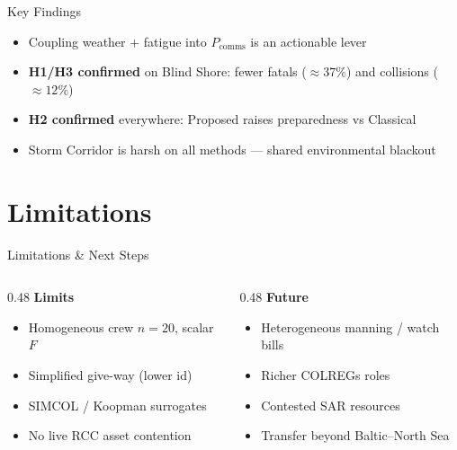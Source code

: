 \documentclass[aspectratio=169]{beamer}
\begin{document}
\begin{frame}{Key Findings}
    \begin{itemize}
        \item Coupling weather + fatigue into $P_{\text{comms}}$ is an actionable lever
        \item \textbf{H1/H3 confirmed} on Blind Shore: fewer fatals (${\approx}37\%$) and collisions (${\approx}12\%$)
        \item \textbf{H2 confirmed} everywhere: Proposed raises preparedness vs Classical
        \item Storm Corridor is harsh on all methods --- shared environmental blackout
    \end{itemize}
\end{frame}

\section{Limitations}

\begin{frame}{Limitations \& Next Steps}
    \begin{columns}[T]
        \begin{column}{0.48\textwidth}
            \textbf{Limits}
            \begin{itemize}
                \item Homogeneous crew $n=20$, scalar $F$
                \item Simplified give-way (lower id)
                \item SIMCOL / Koopman surrogates
                \item No live RCC asset contention
            \end{itemize}
        \end{column}
        \begin{column}{0.48\textwidth}
            \textbf{Future}
            \begin{itemize}
                \item Heterogeneous manning / watch bills
                \item Richer COLREGs roles
                \item Contested SAR resources
                \item Transfer beyond Baltic--North Sea
            \end{itemize}
        \end{column}
    \end{columns}
\end{frame}
\end{document}
